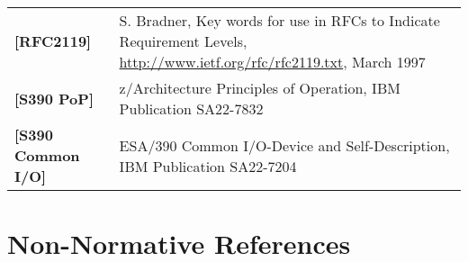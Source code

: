 \begin{longtable}{l p{5in}}
	\label{intro:rfc2119}\textbf{[RFC2119]} & S. Bradner, Key words for use in RFCs to Indicate Requirement Levels, \newline\url{http://www.ietf.org/rfc/rfc2119.txt}, March 1997\\
	\label{intro:S390 PoP}\textbf{[S390 PoP]} & z/Architecture Principles of Operation, \newline IBM Publication SA22-7832\\
	\label{intro:S390 Common I/O}\textbf{[S390 Common I/O]} & ESA/390 Common I/O-Device and Self-Description, \newline IBM Publication SA22-7204\\
\end{longtable}


\section{Non-Normative References}


\newpage

